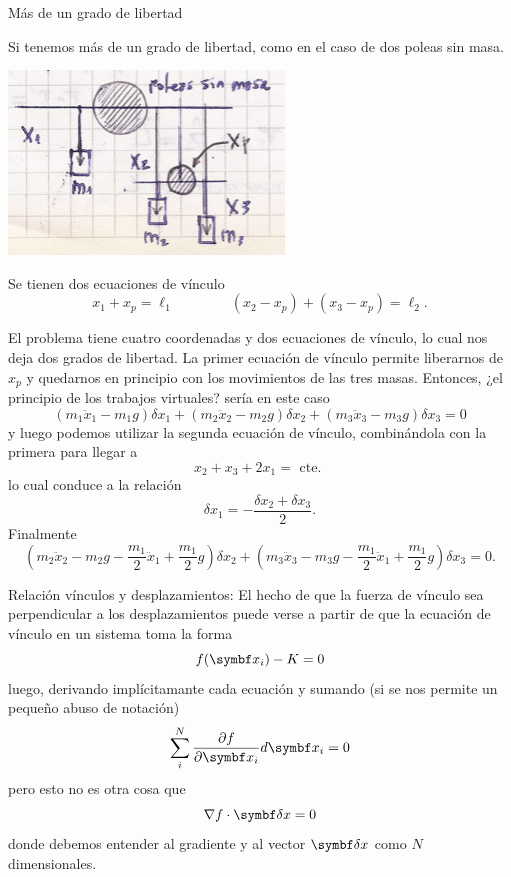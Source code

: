 \documentclass[10pt,oneside]{CBFT_book}
\begin{document}
\begin{ejemplo}{Más de un grado de libertad}

Si tenemos más de un grado de libertad, como en el caso de dos poleas sin masa.

\includegraphics[scale=0.4]{images/fig_mc_dos_poleas.jpg}

Se tienen dos ecuaciones de vínculo
\[
	x_1 + x_p = \ell_1 \qquad \qquad (x_2 -x_p)+(x_3 -x_p) = \ell_2.
\]

El problema tiene cuatro coordenadas y dos ecuaciones de vínculo, lo cual nos deja dos grados de libertad.
La primer ecuación de vínculo permite liberarnos de $x_p$ y quedarnos en principio con los movimientos de
las tres masas. Entonces, ¿el principio de los trabajos virtuales? sería en este caso 
\[
	( m_1 \ddot{x}_1 - m_1 g )\delta x_1 + ( m_2 \ddot{x}_2 - m_2 g )\delta x_2 + ( m_3 \ddot{x}_3 - m_3 g )\delta x_3 = 0
\]
y luego podemos utilizar la segunda ecuación de vínculo, combinándola con la primera para llegar a 
\[
	x_2 + x_3 + 2x_1 = \text{ cte. }
\]
lo cual conduce a la relación 
\[
	\delta x_1 = -\frac{ \delta x_2 + \delta x_3 }{2}.
\]
Finalmente
\[
	( m_2 \ddot{x}_2 - m_2 g -\frac{m_1}{2} \ddot{x}_1 + \frac{m_1}{2} g ) \delta x_2 + 
	( m_3 \ddot{x}_3 - m_3 g -\frac{m_1}{2} \ddot{x}_1 + \frac{m_1}{2} g ) \delta x_3 = 0.
\]
\end{ejemplo}

\begin{notas}{Relación vínculos y desplazamientos:}
El hecho de que la fuerza de vínculo sea perpendicular a los desplazamientos puede
verse a partir de que la ecuación de vínculo en un sistema toma la forma
\[
	f(\vb{x}_i) - K = 0 
\]
luego, derivando implícitamante cada ecuación y sumando (si se nos permite un pequeño
abuso de notación)
\[
	\sum_i^N \dpar{f}{\vb{x}_i} d\vb{x}_i = 0 
\]
pero esto no es otra cosa que
\[
	\nabla f \cdot \vb{\delta x} = 0
\]
donde debemos entender al gradiente y al vector $\vb{\delta x}$ como $N$ dimensionales.
\end{notas}
\end{document}
